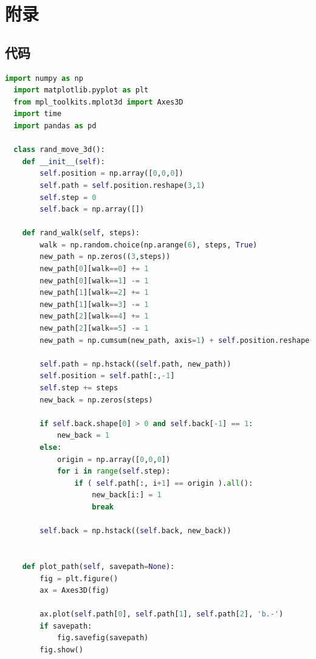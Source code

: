 \documentclass[12pt]{article}
\begin{document}

\newpage
\section*{附录}
\subsection*{代码}

\begin{lstlisting}[language=Python, caption = 随机游走类与批量游走类]
  import numpy as np
  import matplotlib.pyplot as plt
  from mpl_toolkits.mplot3d import Axes3D
  import time
  import pandas as pd

  class rand_move_3d():
    def __init__(self):
        self.position = np.array([0,0,0])
        self.path = self.position.reshape(3,1)
        self.step = 0
        self.back = np.array([])

    def rand_walk(self, steps):
        walk = np.random.choice(np.arange(6), steps, True)
        new_path = np.zeros((3,steps))
        new_path[0][walk==0] += 1
        new_path[0][walk==1] -= 1
        new_path[1][walk==2] += 1
        new_path[1][walk==3] -= 1
        new_path[2][walk==4] += 1
        new_path[2][walk==5] -= 1
        new_path = np.cumsum(new_path, axis=1) + self.position.reshape(3,1)
        
        self.path = np.hstack((self.path, new_path))
        self.position = self.path[:,-1]
        self.step += steps
        new_back = np.zeros(steps)

        if self.back.shape[0] > 0 and self.back[-1] == 1:
            new_back = 1
        else:
            origin = np.array([0,0,0])
            for i in range(self.step):
                if ( self.path[:, i+1] == origin ).all():
                    new_back[i:] = 1
                    break

        self.back = np.hstack((self.back, new_back))


    def plot_path(self, savepath=None):
        fig = plt.figure()
        ax = Axes3D(fig)

        ax.plot(self.path[0], self.path[1], self.path[2], 'b.-')
        if savepath:
            fig.savefig(savepath)
        fig.show()



\end{lstlisting}
\end{document}
